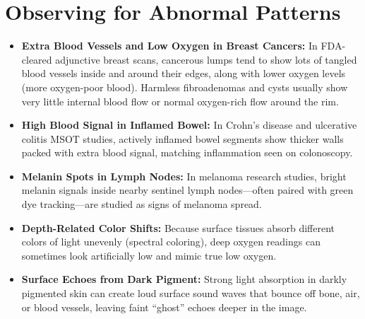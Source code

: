 \section{Observing for Abnormal Patterns}
\begin{itemize}
  \item \textbf{Extra Blood Vessels and Low Oxygen in Breast Cancers:} In FDA-cleared adjunctive breast scans, cancerous lumps tend to show lots of tangled blood vessels inside and around their edges, along with lower oxygen levels (more oxygen-poor blood). Harmless fibroadenomas and cysts usually show very little internal blood flow or normal oxygen-rich flow around the rim.
  \item \textbf{High Blood Signal in Inflamed Bowel:} In Crohn's disease and ulcerative colitis MSOT studies, actively inflamed bowel segments show thicker walls packed with extra blood signal, matching inflammation seen on colonoscopy.
  \item \textbf{Melanin Spots in Lymph Nodes:} In melanoma research studies, bright melanin signals inside nearby sentinel lymph nodes---often paired with green dye tracking---are studied as signs of melanoma spread.
  \item \textbf{Depth-Related Color Shifts:} Because surface tissues absorb different colors of light unevenly (spectral coloring), deep oxygen readings can sometimes look artificially low and mimic true low oxygen.
  \item \textbf{Surface Echoes from Dark Pigment:} Strong light absorption in darkly pigmented skin can create loud surface sound waves that bounce off bone, air, or blood vessels, leaving faint ``ghost'' echoes deeper in the image.
\end{itemize}

